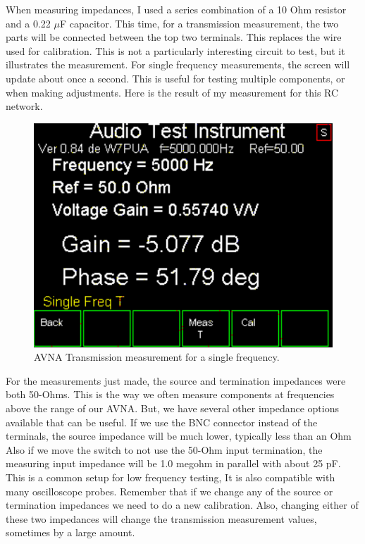 %
When measuring impedances, I used a series combination of a 10 Ohm resistor and a 0.22 $\mu$F capacitor.  This time, for a transmission measurement, the two parts will be connected between the top two terminals. This replaces the wire used for calibration.  This is not a particularly interesting circuit to test, but it illustrates the measurement.  For single frequency measurements, the screen will update about once a second.  This is useful for testing multiple components, or when making adjustments.  Here is the result of my measurement for this RC network.
\begin{figure}[H]
\begin{center}
\includegraphics[scale=0.75]{./images/AVNA_047.pdf}
\caption{AVNA Transmission measurement for a single frequency.}
\label{AVNA_047-label}
\end{center}
\end{figure}
%
For the measurements  just made, the source and termination impedances were both 50-Ohms.  This is the way we often measure components at frequencies above the range of our AVNA.  But, we have several other impedance options available that can be useful.  If we use the BNC connector instead of the terminals, the source impedance will be much lower, typically less than an Ohm  Also if we move the switch to not use the 50-Ohm input termination, the measuring input impedance will be 1.0 megohm in parallel with about 25 pF.  This is a common setup for low frequency testing,  It is also compatible with many oscilloscope probes.  Remember that if we change any of the source or termination impedances we need to do a new calibration.  Also, changing either of these two impedances will change the transmission measurement values, sometimes by a large amount.

